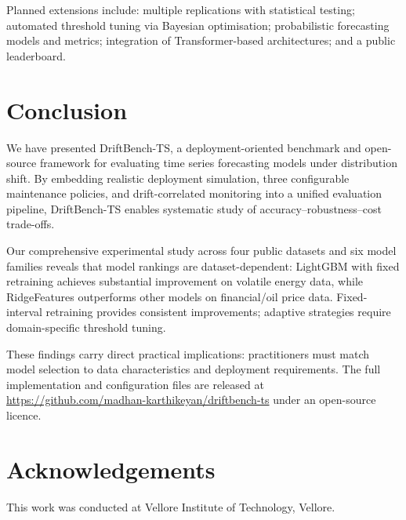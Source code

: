 \documentclass[conference]{IEEEtran}
\begin{document}
Planned extensions include: multiple replications with statistical
testing; automated threshold tuning via Bayesian optimisation;
probabilistic forecasting models and metrics; integration of
Transformer-based architectures; and a public leaderboard.

\section{Conclusion}

We have presented DriftBench-TS, a deployment-oriented benchmark and
open-source framework for evaluating time series forecasting models
under distribution shift. By embedding realistic deployment simulation,
three configurable maintenance policies, and drift-correlated
monitoring into a unified evaluation pipeline, DriftBench-TS enables
systematic study of accuracy--robustness--cost trade-offs.

Our comprehensive experimental study across four public datasets
and six model families reveals that model rankings are
dataset-dependent: LightGBM with fixed retraining achieves substantial
improvement on volatile energy data, while RidgeFeatures outperforms
other models on financial/oil price data. Fixed-interval
retraining provides consistent improvements; adaptive strategies
require domain-specific threshold tuning.

These findings carry direct practical implications: practitioners
must match model selection to data characteristics and deployment
requirements. The full implementation and configuration files are
released at \url{https://github.com/madhan-karthikeyan/driftbench-ts}
under an open-source licence.

\section*{Acknowledgements}

This work was conducted at Vellore Institute of Technology, Vellore.



\end{document}
